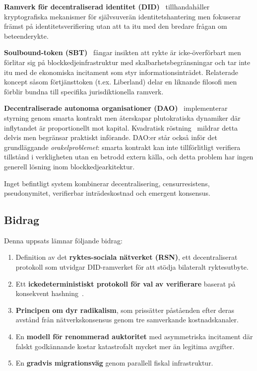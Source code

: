 \documentclass[11pt,a4paper,twocolumn]{article}
\begin{document}
\textbf{Ramverk för decentraliserad identitet (DID)}~\cite{did2022} tillhandahåller kryptografiska mekanismer för självsuverän identitetshantering men fokuserar främst på identitetsverifiering utan att ta itu med den bredare frågan om beteenderykte.

\textbf{Soulbound-token (SBT)}~\cite{weyl2022} fångar insikten att rykte är icke-överförbart men förlitar sig på blockkedjeinfrastruktur med skalbarhetsbegränsningar och tar inte itu med de ekonomiska incitament som styr informationsinträdet. Relaterade koncept såsom förtjänsttoken (t.ex. Liberland) delar en liknande filosofi men förblir bundna till specifika jurisdiktionella ramverk.

\textbf{Decentraliserade autonoma organisationer (DAO)}~\cite{buterin2014} implementerar styrning genom smarta kontrakt men återskapar plutokratiska dynamiker där inflytandet är proportionellt mot kapital. Kvadratisk röstning~\cite{buterin2019} mildrar detta delvis men begränsar praktiskt införande. DAO:er står också inför det grundläggande \emph{orakelproblemet}: smarta kontrakt kan inte tillförlitligt verifiera tillstånd i verkligheten utan en betrodd extern källa, och detta problem har ingen generell lösning inom blockkedjearkitektur.

Inget befintligt system kombinerar decentralisering, censurresistens, pseudonymitet, verifierbar inträdeskostnad och emergent konsensus.

\subsection{Bidrag}

Denna uppsats lämnar följande bidrag:
\begin{enumerate}[nosep]
\item Definition av det \textbf{ryktes-sociala nätverket (RSN)}, ett decentraliserat protokoll som utvidgar DID-ramverket för att stödja bilateralt ryktesutbyte.
\item Ett \textbf{ickedeterministiskt protokoll för val av verifierare} baserat på konsekvent hashning~\cite{karger1997}.
\item \textbf{Principen om dyr radikalism}, som prissätter påståenden efter deras avstånd från nätverkskonsensus genom tre samverkande kostnadskanaler.
\item En \textbf{modell för renommerad auktoritet} med asymmetriska incitament där falskt godkännande kostar katastrofalt mycket mer än legitima avgifter.
\item En \textbf{gradvis migrationsväg} genom parallell fiskal infrastruktur.
\end{enumerate}
\end{document}
